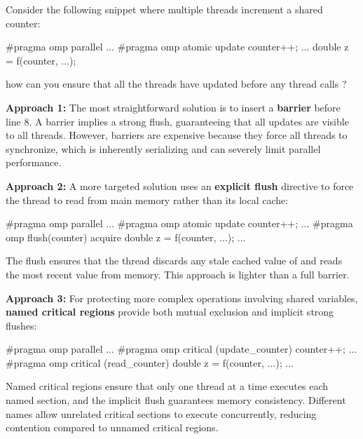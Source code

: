 \begin{exampleblock}

    Consider the following snippet where multiple threads increment a shared counter:

\begin{codeblock}[language = C, morekeywords={pragma}]
#pragma omp parallel
{
    ...
    #pragma omp atomic update
    counter++;
    ...
    double z = f(counter, ...);
}
\end{codeblock}

how can you ensure that all the threads have updated  before any thread calls ?

\medskip

\textbf{Approach 1:} The most straightforward solution is to insert a \textbf{barrier} before line 8. A barrier implies a strong flush, guaranteeing that all updates are visible to all threads. However, barriers are expensive because they force all threads to synchronize, which is inherently serializing and can severely limit parallel performance.

\medskip

\textbf{Approach 2:} A more targeted solution uses an \textbf{explicit flush} directive to force the thread to read from main memory rather than its local cache:

\begin{codeblock}[language = C, morekeywords={pragma}]
#pragma omp parallel
{
    ...
    #pragma omp atomic update
    counter++;
    ...
    #pragma omp flush(counter) acquire
    double z = f(counter, ...);
    ...
}
\end{codeblock}

The  flush ensures that the thread discards any stale cached value of  and reads the most recent value from memory. This approach is lighter than a full barrier.

\medskip

\textbf{Approach 3:} For protecting more complex operations involving shared variables, \textbf{named critical regions} provide both mutual exclusion and implicit strong flushes:

\begin{codeblock}[language = C, morekeywords={pragma}]
#pragma omp parallel
{
    ...
    #pragma omp critical (update_counter)
    counter++;
    ...
    #pragma omp critical (read_counter)
    double z = f(counter, ...);
    ...
}
    
\end{codeblock}

Named critical regions ensure that only one thread at a time executes each named section, and the implicit flush guarantees memory consistency. Different names allow unrelated critical sections to execute concurrently, reducing contention compared to unnamed critical regions.

\end{exampleblock}

